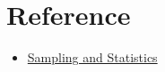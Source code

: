 \section{Reference}
\begin{itemize}
    \item \href{https://faculty.etsu.edu/gardnerr/4047/notes-Hogg-McKean-Craig/Hogg-McKean-Craig-4-1.pdf}{Sampling and Statistics}
\end{itemize}